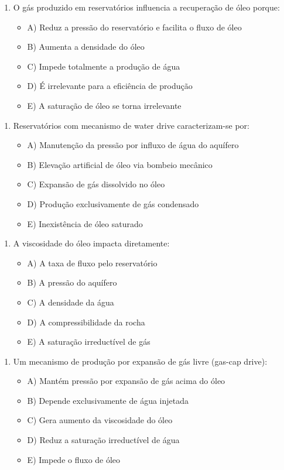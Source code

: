 \documentclass[11pt,a4paper]{article}
\begin{document}
\begin{enumerate}
\item O gás produzido em reservatórios influencia a recuperação de óleo porque:
\begin{itemize}
\item A) Reduz a pressão do reservatório e facilita o fluxo de óleo
\item B) Aumenta a densidade do óleo
\item C) Impede totalmente a produção de água
\item D) É irrelevante para a eficiência de produção
\item E) A saturação de óleo se torna irrelevante
\end{itemize}
\end{enumerate}

\begin{enumerate}
\item Reservatórios com mecanismo de water drive caracterizam-se por:
\begin{itemize}
\item A) Manutenção da pressão por influxo de água do aquífero
\item B) Elevação artificial de óleo via bombeio mecânico
\item C) Expansão de gás dissolvido no óleo
\item D) Produção exclusivamente de gás condensado
\item E) Inexistência de óleo saturado
\end{itemize}
\end{enumerate}

\begin{enumerate}
\item A viscosidade do óleo impacta diretamente:
\begin{itemize}
\item A) A taxa de fluxo pelo reservatório
\item B) A pressão do aquífero
\item C) A densidade da água
\item D) A compressibilidade da rocha
\item E) A saturação irreductível de gás
\end{itemize}
\end{enumerate}

\begin{enumerate}
\item Um mecanismo de produção por expansão de gás livre (gas-cap drive):
\begin{itemize}
\item A) Mantém pressão por expansão de gás acima do óleo
\item B) Depende exclusivamente de água injetada
\item C) Gera aumento da viscosidade do óleo
\item D) Reduz a saturação irreductível de água
\item E) Impede o fluxo de óleo
\end{itemize}
\end{enumerate}
\end{document}
